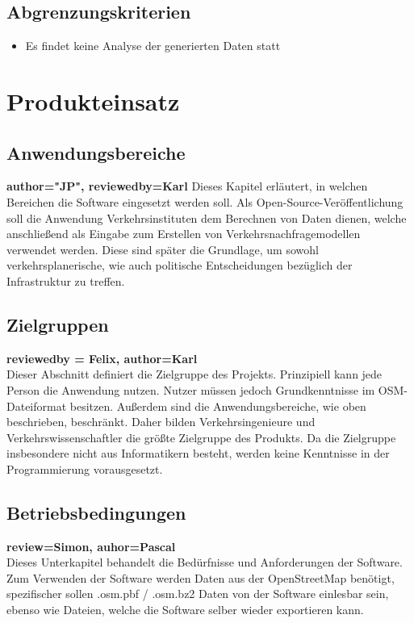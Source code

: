 \documentclass[parskip=full]{scrartcl} %
\begin{document}
\subsection{Abgrenzungskriterien}
\begin{itemize}
    \item Es findet keine Analyse der generierten Daten statt
\end{itemize}
\newpage



\section{Produkteinsatz}

\subsection{Anwendungsbereiche}
\textbf{author="JP", reviewedby=Karl} 
Dieses Kapitel erläutert, in welchen Bereichen die Software eingesetzt werden soll. Als Open-Source-Veröffentlichung soll die Anwendung Verkehrsinstituten dem Berechnen von Daten dienen, welche anschließend als Eingabe zum Erstellen von Verkehrsnachfragemodellen verwendet werden. Diese sind später die Grundlage, um sowohl verkehrsplanerische, wie auch politische Entscheidungen bezüglich der Infrastruktur zu treffen.

\subsection{Zielgruppen}
\textbf{reviewedby = Felix, author=Karl\\}
Dieser Abschnitt definiert die Zielgruppe des Projekts. Prinzipiell kann jede Person die Anwendung nutzen. Nutzer müssen jedoch Grundkenntnisse im OSM-Dateiformat besitzen. Außerdem sind die Anwendungsbereiche, wie oben beschrieben, beschränkt. Daher bilden Verkehrsingenieure und Verkehrswissenschaftler die größte Zielgruppe des Produkts. Da die Zielgruppe insbesondere nicht aus Informatikern besteht, werden keine Kenntnisse in der Programmierung vorausgesetzt.

\subsection{Betriebsbedingungen}
\textbf{review=Simon, auhor=Pascal\\}
Dieses Unterkapitel behandelt die Bedürfnisse und Anforderungen der Software.
Zum Verwenden der Software werden Daten aus der OpenStreetMap benötigt, spezifischer sollen .osm.pbf / .osm.bz2 Daten von der Software einlesbar sein, ebenso wie Dateien, welche die Software selber wieder exportieren kann.
\end{document}
